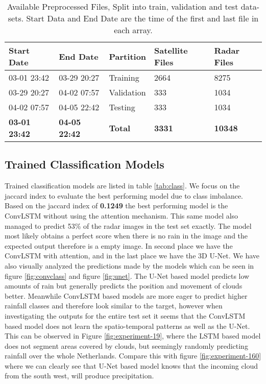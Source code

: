 \begin{table}[]
\caption{Available Preprocessed Files, Split into train, validation and test data-sets. Start Data and End Date are the time of the first and last file in each array.}
\begin{tabular}{@{}lllll@{}}
\toprule
Start Date          & End Date            & Partition  & Satellite Files & Radar Files \\ \midrule
03-01 23:42 & 03-29 20:27 & Training   & 2664            & 8275        \\
03-29 20:27 & 04-02 07:57 & Validation & 333             & 1034        \\
04-02 07:57 & 04-05 22:42 & Testing    & 333             & 1034        \\
\textbf{03-01 23:42} & \textbf{04-05 22:42} & \textbf{Total}      & \textbf{3331}            & \textbf{10348}       \\ \bottomrule
\end{tabular}
\label{tab:data}
\end{table}

\subsection{Trained Classification Models}
Trained classification models are listed in table \ref{tab:class}.
We focus on the jaccard index to evaluate the best performing model due to class imbalance.
Based on the jaccard index of \textbf{0.1249} the best performing model is the ConvLSTM without using the attention mechanism. This same model also managed to
predict 53\% of the radar images in the test set exactly. The model most likely obtains a perfect score when there is no rain in the image and the expected output therefore is a empty image.
In second place we have the ConvLSTM with attention, and in the last place we have the 3D U-Net. We have also visually analyzed the predictions made by the models which can be seen in figure \ref{fig:convclass} and figure \ref{fig:unet}.
The U-Net based model predicts low amounts of rain but generally predicts the position and movement of clouds better. Meanwhile ConvLSTM based models are more eager
to predict higher rainfall classes and therefore look similar to the target, however when investigating the outputs for the entire test set it seems that the ConvLSTM based model does not learn the spatio-temporal patterns
as well as the U-Net. This can be observed in Figure \ref{fig:experiment-19}, where the LSTM based model does not segment areas covered by clouds, but seemingly randomly predicting rainfall over the whole Netherlands.
Compare this with figure \ref{fig:experiment-160} where we can clearly see that U-Net based model knows that the incoming cloud from the south west, will produce precipitation.


